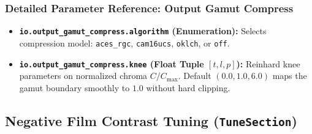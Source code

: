 \documentclass[11pt,a4paper]{article}
\begin{document}
\subsubsection{Detailed Parameter Reference: Output Gamut Compress}
\begin{itemize}[leftmargin=*]
    \item \textbf{\texttt{io.output\_gamut\_compress.algorithm} (Enumeration):}
    Selects compression model: \texttt{aces\_rgc}, \texttt{cam16ucs}, \texttt{oklch}, or \texttt{off}.
    \item \textbf{\texttt{io.output\_gamut\_compress.knee} (Float Tuple $[t, l, p]$):}
    Reinhard knee parameters on normalized chroma $C / C_{\max}$. Default $(0.0, 1.0, 6.0)$ maps the gamut boundary smoothly to $1.0$ without hard clipping.
\end{itemize}

\subsection{Negative Film Contrast Tuning (\texttt{TuneSection})}
\end{document}
